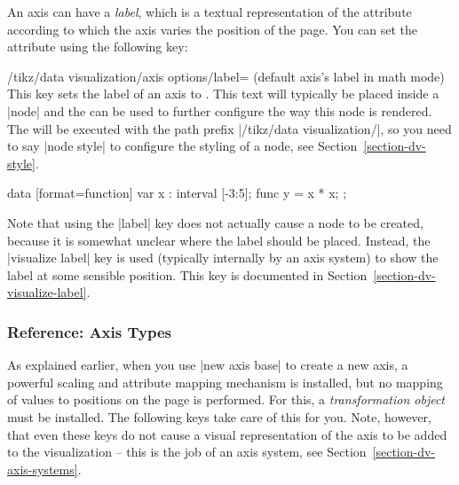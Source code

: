 An axis can have a \emph{label}, which is a textual representation of
the attribute according to which the axis varies the position of the
page. You can set the attribute using the following key:

\begin{key}{/tikz/data visualization/axis
    options/label=
  (default \normalfont axis's label in math mode)}
  This key sets the label of an axis to . This text will
  typically be placed inside a |node| and the  can be
  used to further configure the way this node is rendered. The
   will be executed with the path prefix
  |/tikz/data visualization/|, so you need to say |node style| to
  configure the styling of a node, see Section~\ref{section-dv-style}.
\begin{codeexample}[]
\tikz \datavisualization [
    scientific axes,
    x axis = {label, length=2.5cm},
    y axis = {label={[node style={fill=blue!20}]{$x^2$}}},
    visualize as smooth line]
 data [format=function] {
   var x : interval [-3:5];
   func y = \value x * \value x;
 };
\end{codeexample}  
\end{key}

Note that using the |label| key does not actually cause a node to be
created, because it is somewhat unclear where the label should be
placed. Instead, the |visualize label| key is used (typically
internally by an axis system) to show the label at some sensible
position. This key is documented in
Section~\ref{section-dv-visualize-label}. 



\subsubsection{Reference: Axis Types}

\label{section-dv-reference-axis-types}

As explained earlier, when you use |new axis base| to create a new axis,
a powerful scaling and attribute mapping mechanism is installed, but
no mapping of values to positions on the page is performed. For this,
a \emph{transformation object} must be installed. The following keys
take care of this for you. Note, however, that even these keys do not
cause a visual representation of the axis to be added to the
visualization -- this is the job of an axis system, see
Section~\ref{section-dv-axis-systems}. 

